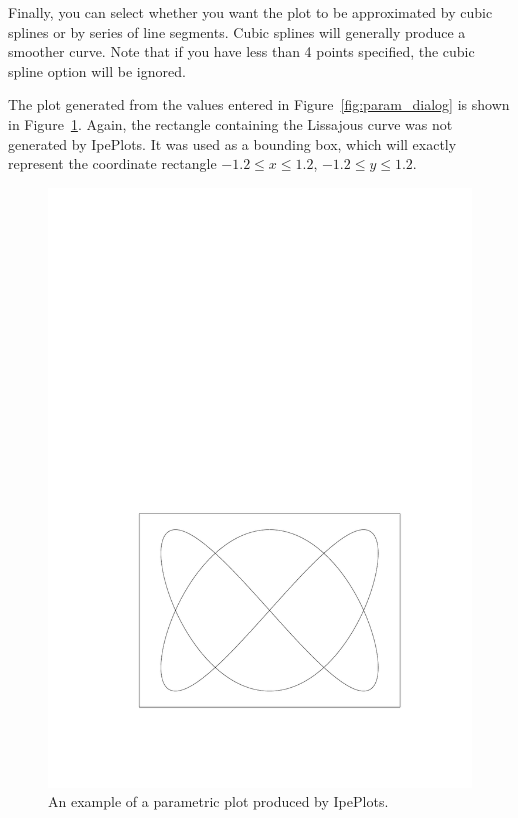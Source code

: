 \documentclass{article}
\begin{document}
Finally, you can select whether you want the plot to be approximated by cubic
splines or by series of line segments. Cubic splines will generally produce a
smoother curve.  Note that if you have less than 4 points specified, the cubic
spline option will be ignored. 

The plot generated from the values entered in Figure~\ref{fig:param_dialog} is
shown in Figure~\ref{fig:param}.  Again, the rectangle containing the Lissajous
curve was not generated by IpePlots. It was used as a bounding box, which will
exactly represent the coordinate rectangle $-1.2\le x \le 1.2$, $-1.2\le y \le
1.2$. 

\begin{figure}[h]
   \begin{center}
      \includegraphics[scale=.7]{param}
   \end{center}
   \caption{An example of a parametric plot produced by IpePlots.}
   \label{fig:param}
\end{figure}
\end{document}
